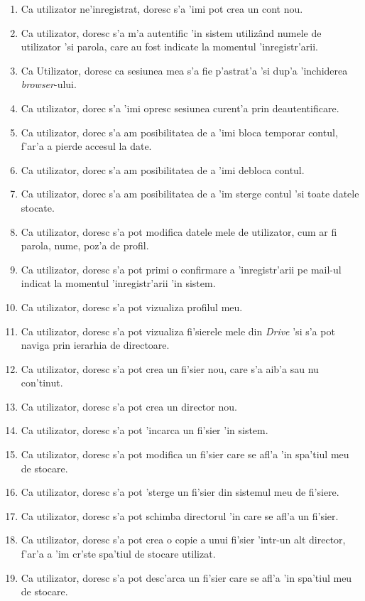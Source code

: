 \documentclass[12pt,a4paper,twoside]{report}
\begin{document}
\begin{enumerate}[label=CF\arabic*]
\item{Ca utilizator ne'inregistrat, doresc s'a 'imi pot crea un cont nou.}
\item{Ca utilizator, doresc s'a m'a autentific 'in sistem utilizând numele de utilizator 'si parola, care au fost indicate la momentul 'inregistr'arii.}
\item{Ca Utilizator, doresc ca sesiunea mea s'a fie p'astrat'a 'si dup'a 'inchiderea \textit{browser}-ului.}
\item{Ca utilizator, dorec s'a 'imi opresc sesiunea curent'a prin deautentificare.}
\item{Ca utilizator, dorec s'a am posibilitatea de a 'imi bloca temporar contul, f'ar'a a pierde accesul la date.}
\item{Ca utilizator, dorec s'a am posibilitatea de a 'imi debloca contul.}
\item{Ca utilizator, dorec s'a am posibilitatea de a 'im sterge contul 'si toate datele stocate.}
\item{Ca utilizator, doresc s'a pot modifica datele mele de utilizator, cum ar fi parola, nume, poz'a de profil.}
\item{Ca utilizator, doresc s'a pot primi o confirmare a 'inregistr'arii pe mail-ul indicat la momentul 'inregistr'arii 'in sistem.}
\item{Ca utilizator, doresc s'a pot vizualiza profilul meu.}
\item{Ca utilizator, doresc s'a pot vizualiza fi'sierele mele din \textit{Drive} 'si s'a pot naviga prin ierarhia de directoare.}
\item{Ca utilizator, doresc s'a pot crea un fi'sier nou, care s'a aib'a sau nu con'tinut.}
\item{Ca utilizator, doresc s'a pot crea un director nou.}
\item{Ca utilizator, doresc s'a pot 'incarca un fi'sier 'in sistem.}
\item{Ca utilizator, doresc s'a pot modifica un fi'sier care se afl'a 'in spa'tiul meu de stocare.}
\item{Ca utilizator, doresc s'a pot 'sterge un fi'sier din sistemul meu de fi'siere.}
\item{Ca utilizator, doresc s'a pot schimba directorul 'in care se afl'a un fi'sier.}
\item{Ca utilizator, doresc s'a pot crea o copie a unui fi'sier 'intr-un alt director, f'ar'a a 'im cr'ste spa'tiul de stocare utilizat.}
\item{Ca utilizator, doresc s'a pot desc'arca un fi'sier care se afl'a 'in spa'tiul meu de stocare.}

\end{enumerate}
\end{document}
